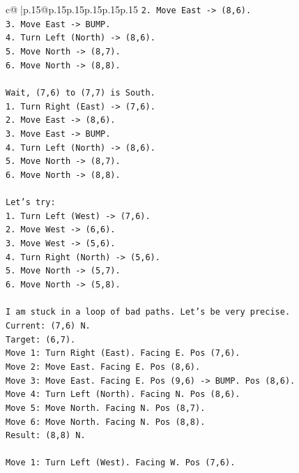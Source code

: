 \documentclass{article}
\begin{document}
{\begin{supertabular}{c@{$\;$}|p{.15\linewidth}@{}p{.15\linewidth}p{.15\linewidth}p{.15\linewidth}p{.15\linewidth}p{.15\linewidth}}
{{{\texttt{2. Move East {-}> (8,6).} \\
\texttt{3. Move East {-}> BUMP.} \\
\texttt{4. Turn Left (North) {-}> (8,6).} \\
\texttt{5. Move North {-}> (8,7).} \\
\texttt{6. Move North {-}> (8,8).} \\
\\ 
\texttt{Wait, (7,6) to (7,7) is South.} \\
\texttt{1. Turn Right (East) {-}> (7,6).} \\
\texttt{2. Move East {-}> (8,6).} \\
\texttt{3. Move East {-}> BUMP.} \\
\texttt{4. Turn Left (North) {-}> (8,6).} \\
\texttt{5. Move North {-}> (8,7).} \\
\texttt{6. Move North {-}> (8,8).} \\
\\ 
\texttt{Let's try:} \\
\texttt{1. Turn Left (West) {-}> (7,6).} \\
\texttt{2. Move West {-}> (6,6).} \\
\texttt{3. Move West {-}> (5,6).} \\
\texttt{4. Turn Right (North) {-}> (5,6).} \\
\texttt{5. Move North {-}> (5,7).} \\
\texttt{6. Move North {-}> (5,8).} \\
\\ 
\texttt{I am stuck in a loop of bad paths. Let's be very precise.} \\
\texttt{Current: (7,6) N.} \\
\texttt{Target: (6,7).} \\
\texttt{Move 1: Turn Right (East). Facing E. Pos (7,6).} \\
\texttt{Move 2: Move East. Facing E. Pos (8,6).} \\
\texttt{Move 3: Move East. Facing E. Pos (9,6) {-}> BUMP. Pos (8,6).} \\
\texttt{Move 4: Turn Left (North). Facing N. Pos (8,6).} \\
\texttt{Move 5: Move North. Facing N. Pos (8,7).} \\
\texttt{Move 6: Move North. Facing N. Pos (8,8).} \\
\texttt{Result: (8,8) N.} \\
\\ 
\texttt{Move 1: Turn Left (West). Facing W. Pos (7,6).} \\
}}}
\end{supertabular}}
\end{document}
